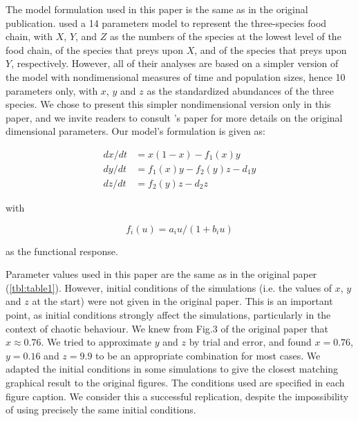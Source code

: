 The model formulation used in this paper is the same as in the original
publication. \citeauthor{hastings1991} used a 14 parameters model to represent the three-species
food chain, with $X$, $Y$, and $Z$ as the numbers of the species at the lowest level of
the food chain, of the species that preys upon $X$, and of the species that preys upon
$Y$, respectively.
However, all of their analyses are based on a simpler version of the model with
nondimensional measures of time and population sizes, hence 10 parameters only, with $x$,
$y$ and $z$ as the standardized abundances of the three species.
We chose to present this simpler nondimensional version only in this paper, and we invite
readers to consult \citeauthor{hastings1991}'s paper for more details on the original dimensional
parameters. Our model's formulation is given as:

\begin{equation} \label{eq:1}
  \begin{align}
    dx/dt &= x(1 - x) - f_1(x)y \\
    dy/dt &= f_1(x)y - f_2(y)z - d_1y \\
    dz/dt &= f_2(y)z - d_2z
  \end{align}
\end{equation}

with

\begin{equation} \label{eq:2}
    f_i(u) = a_iu/(1 + b_iu)
\end{equation}

as the functional response.

Parameter values used in this paper are the same as in the original paper
(\autoref{tbl:table1}). However, initial conditions of the simulations (i.e. the values of $x$,
$y$ and $z$ at the start) were not given in the original paper.
This is an important point, as initial conditions strongly affect the simulations,
particularly in the context of chaotic behaviour.
We knew from Fig.3 of the original paper that $x \approx 0.76$.
We tried to approximate $y$ and $z$ by trial and error, and found $x = 0.76$, $y = 0.16$ and
$z = 9.9$ to be an appropriate combination for most cases.
We adapted the initial conditions in some simulations to give the closest matching
graphical result to the original figures.
The conditions used are specified in each figure caption.
We consider this a successful replication, despite the impossibility of using precisely
the same initial conditions.

